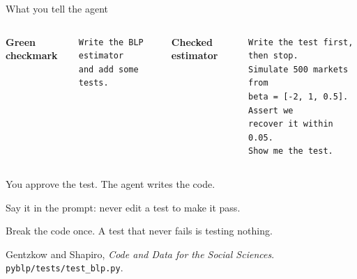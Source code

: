 \documentclass[aspectratio=1610, xcolor={dvipsnames}]{beamer}
\begin{document}
\begin{frame}[fragile]{What you tell the agent}

    \vspace{0.2cm}
    \begin{columns}[T,onlytextwidth]
        {\footnotesize\color{ccwarm}\bfseries Green checkmark}
        \begin{lstlisting}[style=shell]
Write the BLP estimator
and add some tests.
    \end{lstlisting}

        {\footnotesize\color{bhblue}\bfseries Checked estimator}
        \begin{lstlisting}[style=shell]
Write the test first, then stop.
Simulate 500 markets from
beta = [-2, 1, 0.5]. Assert we
recover it within 0.05.
Show me the test.
    \end{lstlisting}
    \end{columns}

    \vspace{0.55cm}
    \small
    You approve the test. The agent writes the code.

    \vspace{0.2cm}
    Say it in the prompt: never edit a test to make it pass.

    \vspace{0.2cm}
    Break the code once. A test that never fails is testing nothing.

    \vspace{0.6cm}
    \footnotesize\color{bhgray}
    Gentzkow and Shapiro, \emph{Code and Data for the Social Sciences}.
    \texttt{pyblp/tests/test\_blp.py}.

\end{frame}
\end{document}
